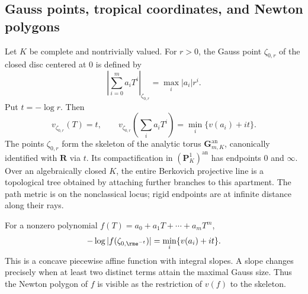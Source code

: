 \subsection{Gauss points, tropical coordinates, and Newton polygons}
\label{sec:ch08-p1-newton}

Let $K$ be complete and nontrivially valued.  For $r>0$, the Gauss point
$\zeta_{0,r}$ of the closed disc centered at $0$ is defined by
\begin{equation}
\label{eq:gauss-disc}
 \left|\sum_{i=0}^m a_iT^i\right|_{\zeta_{0,r}}
 =\max_i|a_i|r^i.
\end{equation}
Put $t=-\log r$.  Then
\[
                    v_{\zeta_{0,r}}(T)=t,
\qquad
 v_{\zeta_{0,r}}\left(\sum_i a_iT^i\right)
 =\min_i\{v(a_i)+it\}.
\]
The points $\zeta_{0,r}$ form the skeleton of the analytic torus
$\mathbf G_{m,K}^{\mathrm{an}}$, canonically identified with $\mathbf R$ via
$t$.  Its compactification in $(\mathbf P^1_K)^{\mathrm{an}}$ has endpoints
$0$ and $\infty$.  Over an algebraically closed $K$, the entire Berkovich projective line is
a topological tree obtained by attaching further branches to this apartment.
The path metric is on the nonclassical locus; rigid endpoints are at
infinite distance along their rays.

\begin{example}
\label{ex:ch08-polynomial-skeleton}
For a nonzero polynomial $f(T)=a_0+a_1T+\cdots+a_mT^m$,
\[
 -\log|f(\zeta_{0,\rme^{-t}})|
 =\min_i\{v(a_i)+it\}.
\]
This is a concave piecewise affine function with integral slopes.  A slope
changes precisely when at least two distinct terms attain the maximal
Gauss size.  Thus the Newton
polygon of $f$ is visible as the restriction of $v(f)$ to the skeleton.
\end{example}

